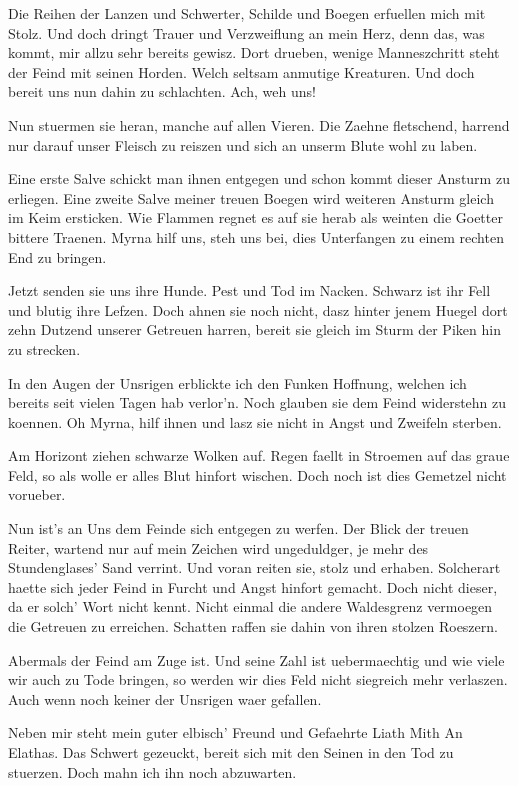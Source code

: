 \documentclass[a5paper,8pt]{book}
\begin{document}
Die Reihen der Lanzen und Schwerter, Schilde und Boegen erfuellen mich mit Stolz. Und doch dringt Trauer und Verzweiflung an mein Herz, denn das, was kommt, mir allzu sehr bereits gewisz. Dort drueben, wenige Manneszchritt steht der Feind mit seinen Horden. Welch seltsam anmutige Kreaturen. Und doch bereit uns nun dahin zu schlachten. Ach, weh uns!

Nun stuermen sie heran, manche auf allen Vieren. Die Zaehne fletschend, harrend nur darauf unser Fleisch zu reiszen und sich an unserm Blute wohl zu laben.

Eine erste Salve schickt man ihnen entgegen und schon kommt dieser Ansturm zu erliegen. Eine zweite Salve meiner treuen Boegen wird weiteren Ansturm gleich im Keim ersticken. Wie Flammen regnet es auf sie herab als weinten die Goetter bittere Traenen. Myrna hilf uns, steh uns bei, dies Unterfangen zu einem rechten End zu bringen.

Jetzt senden sie uns ihre Hunde. Pest und Tod im Nacken. Schwarz ist ihr Fell und blutig ihre Lefzen. Doch ahnen sie noch nicht, dasz hinter jenem Huegel dort zehn Dutzend unserer Getreuen harren, bereit sie gleich im Sturm der Piken hin zu strecken.

In den Augen der Unsrigen erblickte ich den Funken Hoffnung, welchen ich bereits seit vielen Tagen hab verlor’n. Noch glauben sie dem Feind widerstehn zu koennen. Oh Myrna, hilf ihnen und lasz sie nicht in Angst und Zweifeln sterben.

Am Horizont ziehen schwarze Wolken auf. Regen faellt in Stroemen auf das graue Feld, so als wolle er alles Blut hinfort wischen. Doch noch ist dies Gemetzel nicht vorueber.

Nun ist’s an Uns dem Feinde sich entgegen zu werfen. Der Blick der treuen Reiter, wartend nur auf mein Zeichen wird ungeduldger, je mehr des Stundenglases’ Sand verrint. Und voran reiten sie, stolz und erhaben. Solcherart haette sich jeder Feind in Furcht und Angst hinfort gemacht. Doch nicht dieser, da er solch’ Wort nicht kennt.
Nicht einmal die andere Waldesgrenz vermoegen die Getreuen zu erreichen. Schatten raffen sie dahin von ihren stolzen Roeszern.

Abermals der Feind am Zuge ist. Und seine Zahl ist uebermaechtig und wie viele wir auch zu Tode bringen, so werden wir dies Feld nicht siegreich mehr verlaszen. Auch wenn noch keiner der Unsrigen waer gefallen.

Neben mir steht mein guter elbisch’ Freund und Gefaehrte Liath Mith An Elathas. Das Schwert gezeuckt, bereit sich mit den Seinen in den Tod zu stuerzen. Doch mahn ich ihn noch abzuwarten.
\end{document}
